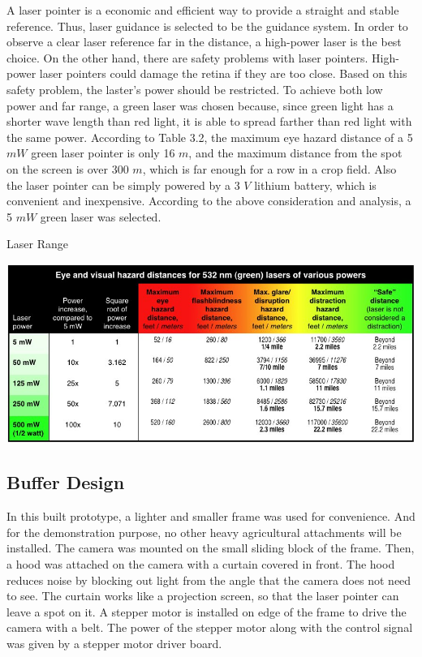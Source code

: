 A laser pointer is a economic and efficient way to provide a straight and stable reference. Thus, laser guidance is selected to be the guidance system. In order to observe a clear laser reference far in the distance, a high-power laser is the best choice. On the other hand, there are safety problems with laser pointers. High-power laser pointers could damage the retina if they are too close. Based on this safety problem, the laster's power should be restricted. To achieve both low power and far range, a green laser was chosen because, since green light has a shorter wave length than red light, it is able to spread farther than red light with the same power. According to Table 3.2, the maximum eye hazard distance of a 5 $mW$ green laser pointer is only 16 $m$, and the maximum distance from the spot on the screen is over 300 $m$, which is far enough for a row in a crop field. Also the laser pointer can be simply powered by a 3 $V$ lithium battery, which is convenient and inexpensive. According to the above consideration and analysis, a 5 $mW$ green laser was selected.
\begin{table}[ht!]
\begin{center}
\caption{Laser Range}
\includegraphics[scale = 0.5]{pics/laserrange.jpg}
\end{center}
\end{table}

\subsection{Buffer Design}


In this built prototype, a lighter and smaller frame was used for convenience. And for the demonstration purpose, no other heavy agricultural attachments will be installed. The camera was mounted on the small sliding block of the frame. Then, a hood was attached on the camera with a curtain covered in front. The hood reduces noise by blocking out light from the angle that the camera does not need to see. The curtain works like a projection screen, so that the laser pointer can leave a spot on it.  A stepper motor is installed on edge of the frame to drive the camera with a belt. The power of the stepper motor along with the control signal was given by a stepper motor driver board. 


